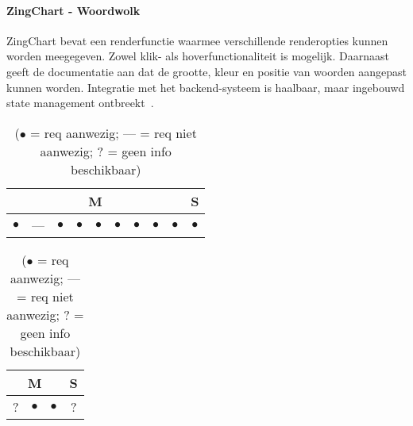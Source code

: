 \paragraph{ZingChart - Woordwolk}
ZingChart bevat een renderfunctie waarmee verschillende renderopties kunnen worden meegegeven. Zowel klik- als hoverfunctionaliteit is mogelijk. Daarnaast geeft de documentatie aan dat de grootte, kleur en positie van woorden aangepast kunnen worden. Integratie met het backend-systeem is haalbaar, maar ingebouwd state management ontbreekt~\autocite{ZingChart2009}.
\begin{table}[htbp]
    \centering
    \begin{minipage}{0.48\textwidth}
        \centering
        \begin{tabular}{|ccccccccc|c|}
            \hline
            \multicolumn{9}{|c|}{M} & \multicolumn{1}{c|}{S} \\
            \midrule
            $\bullet$ & --- & $\bullet$ & $\bullet$ & $\bullet$ & $\bullet$ & $\bullet$ & $\bullet$ & $\bullet$ & $\bullet$ \\
            \bottomrule
        \end{tabular}
        \caption{ZingChart Woordwolk - Functionele requirements}
    \end{minipage}
    \hfill
    \begin{minipage}{0.48\textwidth}
        \centering
        \begin{tabular}{|ccc|c|}
            \hline
            \multicolumn{3}{|c|}{M} & \multicolumn{1}{c|}{S} \\
            \midrule
            ? & $\bullet$ & $\bullet$ & ? \\
            \bottomrule
        \end{tabular}
        \caption{ZingChart Woordwolk - Niet-functionele requirements}
    \end{minipage}
    \caption*{($\bullet$ = req aanwezig; --- = req niet aanwezig; ? = geen info beschikbaar)}
\end{table}


